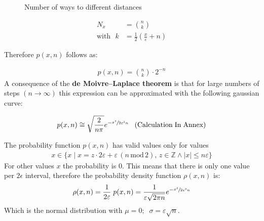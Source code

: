 \documentclass[a4paper, parskip=half]{scrartcl}
\newcommand{\effect}[1]{%
	\textbf{#1}%
}
\newcommand{\myEqLabel}[1]{\label{eq:#1}}
\newcommand{\myEqAnnex}[1]{\;\;\;\mathrm{(Calculation\;In\;Annex)} \myEqLabel{#1}}
\begin{document}
\begin{figure}[H]
\centering
{}
\caption{Number of ways to different distances}
\end{figure}

\begin{align}
N_x &= \binom{n}{k}\\
\mathrm{with} \, \, \,\, k &= \frac{1}{2}\left(\frac{x}{\varepsilon} + n \right)
\end{align}

Therefore $p(x,n)$ follows as:

\begin{align}
p(x,n) = \binom{n}{k} \cdot 2^{-n}
\end{align}
A consequence of the \effect{de Moivre–Laplace theorem} is that for large numbers of steps $(n\rightarrow\infty)$ this expression can be approximated with the following gaussian curve:

\begin{align}
p(x,n) \cong \sqrt{\frac{2}{n \pi}} e^{-\sfrac{x^2}{2\varepsilon^2 n}} \myEqAnnex{moivre_laplace_theorem}
\end{align}

The probability function $p(x,n)$ has valid values only for values 
\begin{align}
x \in \{x\; |\; x = z \cdot 2 \varepsilon + \varepsilon\, (n\,\mathrm{mod}\, 2),\, z \in \mathbb{Z} \wedge |x| \leq n \varepsilon\} 
\end{align}
For other values $x$ the probability is $0$. This means that there is only one value per $2\epsilon$ interval, therefore the probability density function $\rho(x,n)$ is:
\begin{align}
\rho(x,n) = \frac{1}{2\varepsilon}\; p(x,n) = \frac{1}{\varepsilon\sqrt{2\pi n}} e^{-\sfrac{x^2}{2\varepsilon^2 n}}
\end{align}
Which is the normal distribution with $\mu = 0;\;\; \sigma =  \varepsilon\sqrt{n}$.
\end{document}

